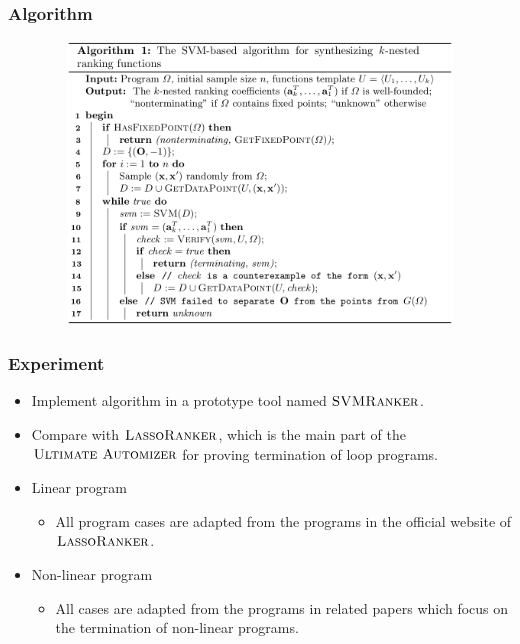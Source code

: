 \begin{frame}
\frametitle{Algorithm}
\begin{figure}  %
  \includegraphics[width=12cm,height = 7.5cm]{pictures/algorithm}  
\end{figure}
\end{frame}



\begin{frame}
\frametitle{Experiment}
\begin{itemize}
\item Implement algorithm in a prototype tool named $\textsc{SVMRanker}$.
\item Compare with $\textsc{LassoRanker}$, which is the main part of the $\textsc{Ultimate Automizer}$ for proving termination of loop programs.
\item Linear program
\begin{itemize}
\item All program cases are adapted from the programs in the official website of $\textsc{LassoRanker}$.
\end{itemize}

\item Non-linear program
\begin{itemize}
\item All cases are adapted from the programs in related papers which focus on the termination of non-linear programs.
\end{itemize}
\end{itemize}
\end{frame}

